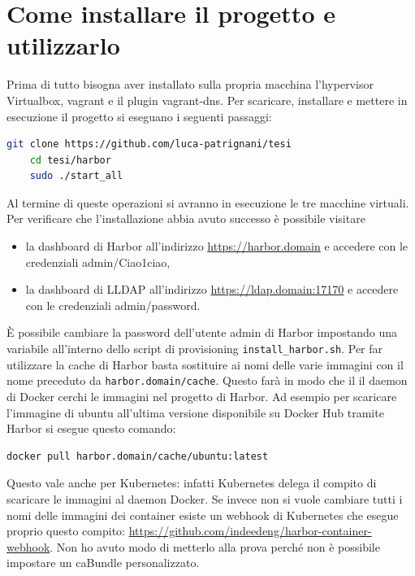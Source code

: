 \documentclass[12pt]{report}
\begin{document}
\section{Come installare il progetto e utilizzarlo}
Prima di tutto bisogna aver installato sulla propria macchina l'hypervisor Virtualbox, vagrant e il plugin vagrant-dns.
Per scaricare, installare e mettere in esecuzione il progetto si eseguano i seguenti passaggi:
\begin{lstlisting}[language=bash]
    git clone https://github.com/luca-patrignani/tesi
    cd tesi/harbor
    sudo ./start_all
\end{lstlisting}
Al termine di queste operazioni si avranno in esecuzione le tre macchine virtuali. Per verificare che l'installazione abbia avuto successo è possibile visitare
\begin{itemize}
    \item la dashboard di Harbor all'indirizzo \url{https://harbor.domain} e accedere con le credenziali admin/Ciao1ciao,
    \item la dashboard di LLDAP all'indirizzo \url{https://ldap.domain:17170} e accedere con le credenziali admin/password.
\end{itemize}
È possibile cambiare la password dell'utente admin di Harbor impostando una variabile all'interno dello script di provisioning \texttt{install\_harbor.sh}.
Per far utilizzare la cache di Harbor basta sostituire ai nomi delle varie immagini con il nome preceduto da \texttt{harbor.domain/cache}. Questo farà in modo che il il daemon di Docker cerchi le immagini nel progetto di Harbor. Ad esempio per scaricare l'immagine di ubuntu all'ultima versione disponibile su Docker Hub tramite Harbor si esegue questo comando:
\begin{lstlisting}[language=bash]
    docker pull harbor.domain/cache/ubuntu:latest
\end{lstlisting}
Questo vale anche per Kubernetes: infatti Kubernetes delega il compito di scaricare le immagini al daemon Docker. Se invece non si vuole cambiare tutti i nomi delle immagini dei container esiste un webhook di Kubernetes che esegue proprio questo compito: \href{harbor-container-webhook}{https://github.com/indeedeng/harbor-container-webhook}. Non ho avuto modo di metterlo alla prova perché non è possibile impostare un caBundle personalizzato. 
\end{document}
